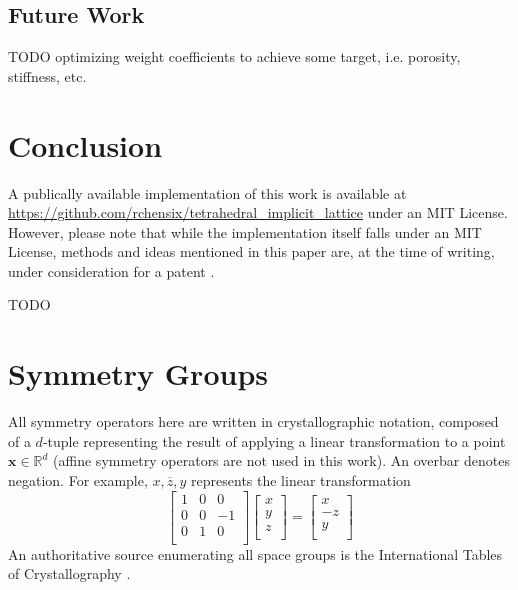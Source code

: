 \documentclass[acmtog]{acmart}
\begin{document}
\subsection{Future Work}
TODO optimizing weight coefficients to achieve some target, i.e. porosity, stiffness, etc.

\section{Conclusion}

A publically available implementation of this work is available at \url{https://github.com/rchensix/tetrahedral_implicit_lattice} under an MIT License. However, please note that while the implementation itself falls under an MIT License, methods and ideas mentioned in this paper are, at the time of writing, under consideration for a patent \cite{chen2022}.

\begin{acks}
TODO
\end{acks}




\appendix

\section{Symmetry Groups}
\label{sec:symmetry_groups}
All symmetry operators here are written in crystallographic notation, composed of a $d$-tuple representing the result of applying a linear transformation to a point $\mathbf{x} \in \mathbb{R}^d$ (affine symmetry operators are not used in this work). An overbar denotes negation. For example, $x, \overline{z}, y$ represents the linear transformation
\begin{equation}
  \begin{bmatrix}
    1 & 0 & 0 \\
    0 & 0 & -1 \\
    0 & 1 & 0 \\
  \end{bmatrix}
  \begin{bmatrix}
    x \\
    y \\
    z \\
  \end{bmatrix}
  =
  \begin{bmatrix}
    x \\
    -z \\
    y \\
  \end{bmatrix}
\end{equation}
An authoritative source enumerating all space groups is the International Tables of Crystallography \cite{aroyo2016}.
\end{document}
